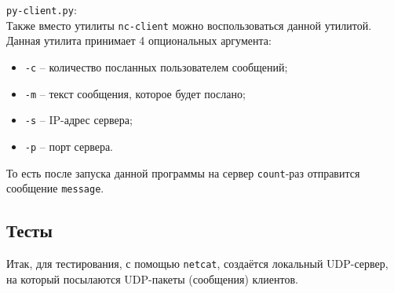 \newpage

\verb|py-client.py|:\\
Также вместо утилиты \verb|nc-client| можно воспользоваться данной утилитой. Данная утилита принимает 4 опциональных аргумента:
\begin{itemize}
    \item \verb|-c| -- количество посланных пользователем сообщений;
    \item \verb|-m| -- текст сообщения, которое будет послано;
    \item \verb|-s| -- IP-адрес сервера;
    \item \verb|-p| -- порт сервера.
\end{itemize}
То есть после запуска данной программы на сервер \verb|count|-раз отправится сообщение \verb|message|.

\subsection{Тесты}

Итак, для тестирования, с помощью \verb|netcat|, создаётся локальный UDP-сервер, на который посылаются UDP-пакеты (сообщения) клиентов.

